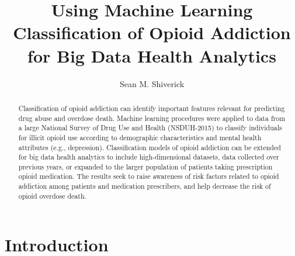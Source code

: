 \documentclass[sigconf]{acmart}
\begin{document}
\title{Using Machine Learning Classification of Opioid Addiction
for Big Data Health Analytics}

  \author{Sean M. Shiverick}

\renewcommand{\shortauthors}{S.M. Shiverick}


\begin{abstract}
Classification of opioid addiction can identify important features relevant 
for predicting drug abuse and overdose death. Machine learning procedures were 
applied to data from a large National Survey of Drug Use and Health (NSDUH-2015) 
to classify individuals for illicit opioid use according to demographic 
characteristics and mental health attributes (e.g., depression). Classification 
models of opioid addiction can be extended for big data health analytics to 
include high-dimensional datasets, data collected over previous years, or 
expanded to the larger population of patients taking prescription opioid 
medication. The results seek to raise awareness of risk factors related to 
opioid addiction among patients and medication prescribers, and help 
decrease the risk of opioid overdose death. 
\end{abstract}


\maketitle

\section{Introduction}
\end{document}
